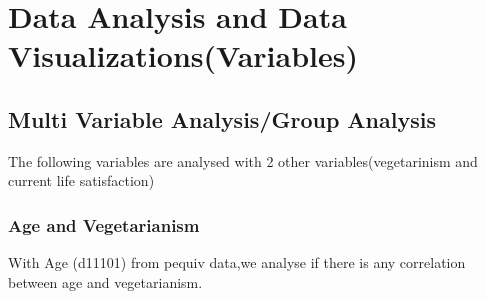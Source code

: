 \documentclass[
]{article}
\begin{document}
\section{Data Analysis and Data
Visualizations(Variables)}\label{data-analysis-and-data-visualizationsvariables}

\subsection{Multi Variable Analysis/Group
Analysis}\label{multi-variable-analysisgroup-analysis}

The following variables are analysed with 2 other variables(vegetarinism
and current life satisfaction)

\subsubsection{Age and Vegetarianism}\label{age-and-vegetarianism}

With Age (d11101) from pequiv data,we analyse if there is any
correlation between age and vegetarianism.
\end{document}
